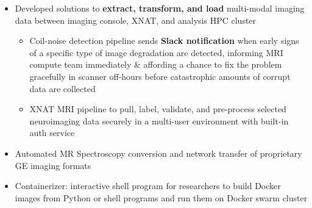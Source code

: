 \documentclass[10pt,a4paper,ragged2e]{altacv}
\begin{document}
\begin{fullwidth}
\begin{itemize}[label={}]
\end{itemize}

\divider

\begin{itemize}[label={}]
    \item Developed solutions to \textbf{extract, transform, and load} multi-modal imaging data 
between imaging console, XNAT, and analysis HPC cluster

    \begin{itemize}[label={-}]
        \item Coil-noise detection pipeline sends \textbf{Slack notification} when early signs of a 
specific type of image degradation are detected, informing MRI compute team immediately \& affording 
a chance to fix the problem gracefully in scanner off-hours before catastrophic amounts of corrupt 
data are collected
        \item XNAT MRI pipeline to pull, label, validate, and pre-process selected neuroimaging data 
securely in a multi-user environment with built-in auth service
    \end{itemize}
\end{itemize}

\end{fullwidth}

\begin{itemize}[label={}]
    \begin{itemize}[label={}]
        \item Automated MR Spectroscopy conversion and network transfer of proprietary GE imaging 
formats
    
        \item Containerizer: interactive shell program for researchers to build Docker images from 
Python or shell programs and run them on Docker swarm cluster
    \end{itemize}
\end{itemize}



\divider
\end{document}
